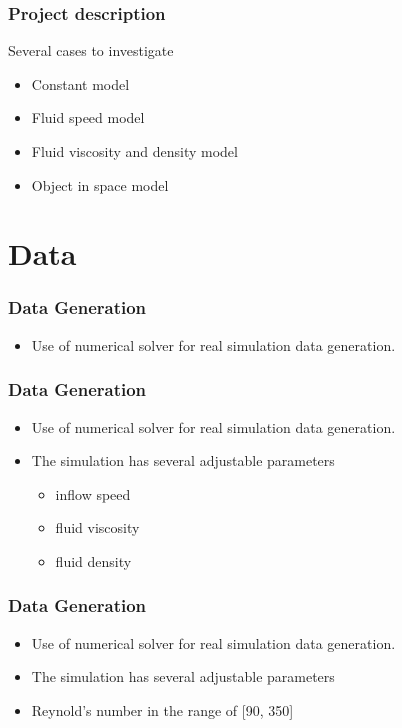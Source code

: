 \documentclass[18pt]{beamer}
\begin{document}
\begin{frame}[t]
  \frametitle{Project description}
  \large{Several cases to investigate}
  \begin{itemize}
  \item Constant model
  \item Fluid speed model
  \item Fluid viscosity and density model
  \item Object in space model
  \end{itemize}
  
\end{frame}

\section{Data}

\begin{frame}[t]
  \frametitle{Data Generation}
  \begin{itemize}
  \item Use of numerical solver for real simulation data generation.
  \end{itemize}
\end{frame}


\begin{frame}[t]
  \frametitle{Data Generation}
  \begin{itemize}
  \item Use of numerical solver for real simulation data generation.
  \item The simulation has several adjustable parameters
    \begin{itemize}
    \item inflow speed
    \item fluid viscosity
    \item fluid density
    \end{itemize}
  \end{itemize}  
\end{frame}

\begin{frame}[t]
  \frametitle{Data Generation}
  \begin{itemize}
  \item Use of numerical solver for real simulation data generation.
  \item The simulation has several adjustable parameters
  \item Reynold's number in the range of [90, 350]
  \end{itemize}
\end{frame}
\end{document}
